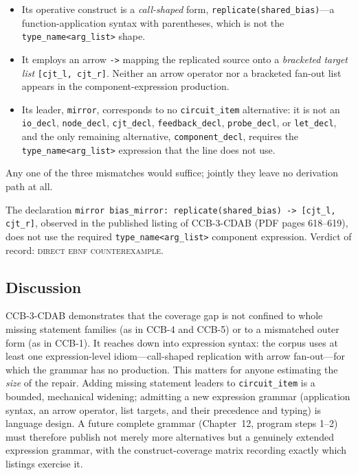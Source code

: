 \begin{itemize}
\item Its operative construct is a \emph{call-shaped} form, \texttt{replicate(shared\_bias)}---a function-application syntax with parentheses, which is not the \texttt{type\_name<arg\_list>} shape.
\item It employs an arrow \texttt{->} mapping the replicated source onto a \emph{bracketed target list} \texttt{[cjt\_l, cjt\_r]}. Neither an arrow operator nor a bracketed fan-out list appears in the component-expression production.
\item Its leader, \texttt{mirror}, corresponds to no \texttt{circuit\_item} alternative: it is not an \texttt{io\_decl}, \texttt{node\_decl}, \texttt{cjt\_decl}, \texttt{feedback\_decl}, \texttt{probe\_decl}, or \texttt{let\_decl}, and the only remaining alternative, \texttt{component\_decl}, requires the \texttt{type\_name<arg\_list>} expression that the line does not use.
\end{itemize}

Any one of the three mismatches would suffice; jointly they leave no derivation path at all.

\begin{finding}\label{ch10:find-ccb3}
The declaration \texttt{mirror bias\_mirror: replicate(shared\_bias) -> [cjt\_l, cjt\_r]}, observed in the published listing of CCB-3-CDAB (PDF pages 618--619), does not use the required \texttt{type\_name<arg\_list>} component expression. Verdict of record: \textsc{direct ebnf counterexample}.
\end{finding}

\subsection{Discussion}

CCB-3-CDAB demonstrates that the coverage gap is not confined to whole missing statement families (as in CCB-4 and CCB-5) or to a mismatched outer form (as in CCB-1). It reaches down into expression syntax: the corpus uses at least one expression-level idiom---call-shaped replication with arrow fan-out---for which the grammar has no production. This matters for anyone estimating the \emph{size} of the repair. Adding missing statement leaders to \texttt{circuit\_item} is a bounded, mechanical widening; admitting a new expression grammar (application syntax, an arrow operator, list targets, and their precedence and typing) is language design. A future complete grammar (Chapter~12, program steps 1--2) must therefore publish not merely more alternatives but a genuinely extended expression grammar, with the construct-coverage matrix recording exactly which listings exercise it.

